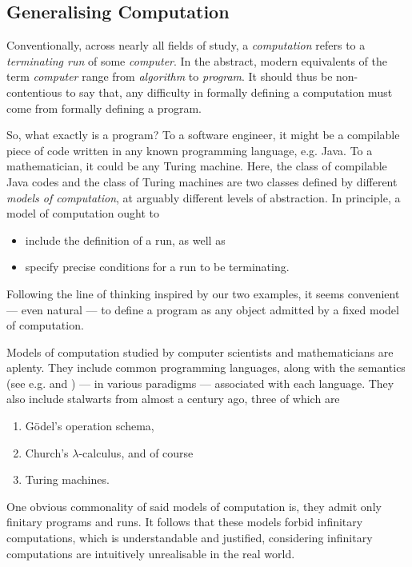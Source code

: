 \documentclass[12pt]{article}
\numberwithin{equation}{section}
\begin{document}
\subsection{Generalising Computation}

Conventionally, across nearly all fields of study, a \textit{computation} refers to a \textit{terminating run} of some \textit{computer}. In the abstract, modern equivalents of the term \textit{computer} range from \textit{algorithm} to \textit{program}. It should thus be non-contentious to say that, any difficulty in formally defining a computation must come from formally defining a program.

So, what exactly is a program? To a software engineer, it might be a compilable piece of code written in any known programming language, e.g. Java. To a mathematician, it could be any Turing machine. Here, the class of compilable Java codes and the class of Turing machines are two classes defined by different \textit{models of computation}, at arguably different levels of abstraction. In principle, a model of computation ought to 
\begin{itemize}
    \item include the definition of a run, as well as
    \item specify precise conditions for a run to be terminating.
\end{itemize} 
Following the line of thinking inspired by our two examples, it seems convenient --- even natural --- to define a program as any object admitted by a fixed model of computation. 

Models of computation studied by computer scientists and mathematicians are aplenty. They include common programming languages, along with the semantics (see e.g.\cite{scott} and \cite{meyer}) --- in various paradigms --- associated with each language. They also include stalwarts from almost a century ago, three of which are
\begin{enumerate}[leftmargin=40pt, label=(CT\arabic*)]
    \item\label{ct1} G\"{o}del's operation schema,
    \item Church's $\lambda$-calculus, and of course
    \item\label{ct3} Turing machines.
\end{enumerate}
One obvious commonality of said models of computation is, they admit only finitary programs and runs. It follows that these models forbid infinitary computations, which is understandable and justified, considering infinitary computations are intuitively unrealisable in the real world. 
\end{document}
